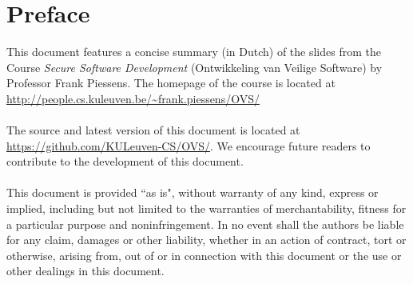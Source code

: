 \documentclass[main.tex]{subfiles}
\begin{document}
\chapter*{Preface}
This document features a concise summary (in Dutch) of the slides from the Course \textit{Secure Software Development} (Ontwikkeling van Veilige Software) by Professor Frank Piessens. The homepage of the course is located at \url{http://people.cs.kuleuven.be/~frank.piessens/OVS/}
\\\\
The source and latest version of this document is located at \url{https://github.com/KULeuven-CS/OVS/}. We encourage future readers to contribute to the development of this document.
\\\\
This document is provided ``as is", without warranty of any kind, express or implied, including but not limited to the warranties of merchantability, fitness for a particular purpose and noninfringement.
In no event shall the authors be liable for any claim, damages or other liability, whether in an action of contract, tort or otherwise, arising from, out of or in connection with this document or the use or other dealings in this document.
\end{document}
